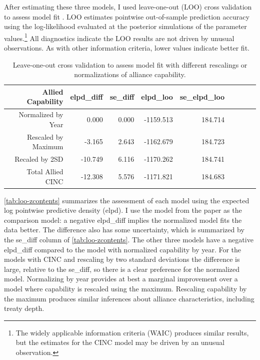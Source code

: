 \documentclass[12pt]{article}
\begin{document}
After estimating these three models, I used leave-one-out (LOO) cross validation to assess model fit \citep{Vehtarietal2017}. 
LOO estimates pointwise out-of-sample prediction accuracy using the log-likelihood evaluated at the posterior simulations of the parameter values.\footnote{The widely applicable information criteria (WAIC) produces similar results, but the estimates for the CINC model may be driven by an unusual observation.} 
All diagnostics indicate the LOO results are not driven by unusual observations. 
As with other information criteria, lower values indicate better fit. 

 

\begin{table}[ht]
\centering
\begin{tabular}{rrrrrrrrr}
  \hline
 Allied Capability & elpd\_diff & se\_diff & elpd\_loo & se\_elpd\_loo  \\ 
  \hline
  Normalized by Year & 0.000 & 0.000 & -1159.513 & 184.714 \\ 
  Rescaled by Maximum & -3.165 & 2.643 & -1162.679 & 184.723  \\ 
  Recaled by 2SD & -10.749 & 6.116 & -1170.262 & 184.741  \\ 
  Total Allied CINC & -12.308 & 5.576 & -1171.821 & 184.683  \\ 
   \hline
\end{tabular}
\caption{Leave-one-out cross validation to assess model fit with different rescalings or normalizations of alliance capability. }
\label{tab:loo-zcontents}
\end{table}

\autoref{tab:loo-zcontents} summarizes the assessment of each model using the expected log pointwise predictive density (elpd). 
I use the model from the paper as the comparison model: a negative elpd\_diff implies the normalized model fits the data better. 
The difference also has some uncertainty, which is summarized by the se\_diff column of \autoref{tab:loo-zcontents}. 
The other three models have a negative elpd\_diff compared to the model with normalized capability by year. 
For the models with CINC and rescaling by two standard deviations the difference is large, relative to the se\_diff, so there is a clear preference for the normalized model. 
Normalizing by year provides at best a marginal improvement over a model where capability is rescaled using the maximum. 
Rescaling capability by the maximum produces similar inferences about alliance characteristics, including treaty depth. 
\end{document}
